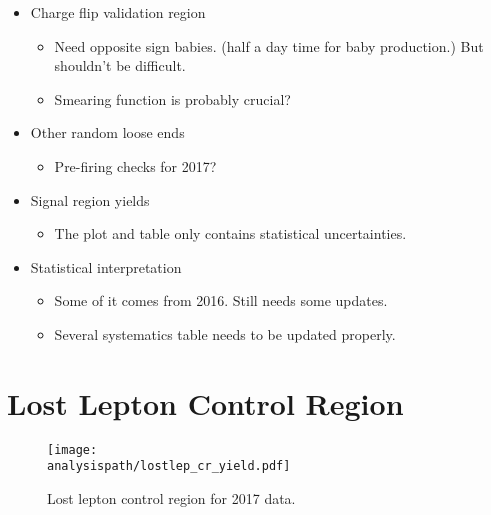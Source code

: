 \documentclass[12pt]{article}
\newcommand{\analysispath}{/home/users/phchang/public_html/analysis/www/code/WWWAnalysisRun2/analysis/plots/WWW2017_v4.0.6/test22}
\begin{document}
\begin{itemize}
\begin{itemize}
        \end{itemize}
    \item Charge flip validation region
        \begin{itemize}
            \item Need opposite sign babies. (half a day time for baby production.) But shouldn't be difficult.
            \item Smearing function is probably crucial?
        \end{itemize}
    \item Other random loose ends
        \begin{itemize}
            \item Pre-firing checks for 2017?
        \end{itemize}
    \item Signal region yields
        \begin{itemize}
            \item The plot and table only contains statistical uncertainties.
        \end{itemize}
    \item Statistical interpretation
        \begin{itemize}
            \item Some of it comes from 2016. Still needs some updates.
            \item Several systematics table needs to be updated properly.
        \end{itemize}
\end{itemize}


\section{Lost Lepton Control Region}



\begin{figure}[!htb]
    \centering
    \texttt{[image: \\analysispath/lostlep\_cr\_yield.pdf]}
    \caption{
        \label{fig:2017:lostlepcr} Lost lepton control region for 2017 data.
    }
\end{figure}



\end{document}
